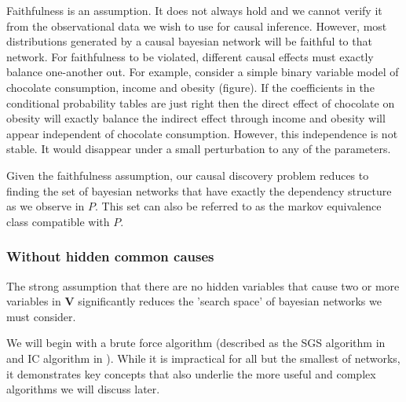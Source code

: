 \documentclass[11pt,a4paper,oneside]{book}
\begin{document}
Faithfulness is an assumption. It does not always hold and we cannot verify it from the observational data we wish to use for causal inference. However, most distributions generated by a causal bayesian network will be faithful to that network. For faithfulness to be violated, different causal effects must exactly balance one-another out. For example, consider a simple binary variable model of chocolate consumption, income and obesity (figure). If the coefficients in the conditional probability tables are just right then the direct effect of chocolate on obesity will exactly balance the indirect effect through income and obesity will appear independent of chocolate consumption. However, this independence is not stable. It would disappear under a small perturbation to any of the parameters.   

Given the faithfulness assumption, our causal discovery problem reduces to finding the set of bayesian networks that have exactly the dependency structure as we observe in $P$. This set can also be referred to as the markov equivalence class compatible with $P$.

\subsubsection{Without hidden common causes}
The strong assumption that there are no hidden variables that cause two or more variables in $\boldsymbol{V}$ significantly reduces the 'search space' of bayesian networks we must consider. 

We will begin with a brute force algorithm (described as the SGS algorithm in \cite{Sprites} and IC algorithm in \cite{Pearl2000}). While it is impractical for all but the smallest of networks, it demonstrates key concepts that also underlie the more useful and complex algorithms we will discuss later. 
\end{document}
